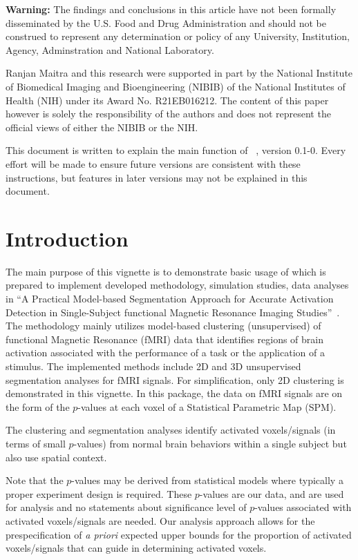 
{\color{red} \bf Warning:}
The findings and conclusions in this article have not been
formally disseminated by the U.S. Food and Drug Administration
and should not be construed to represent any determination or
policy of any University, Institution, Agency, Adminstration
and National Laboratory.

Ranjan Maitra and
this research were supported in part by the National Institute of
Biomedical Imaging and Bioengineering (NIBIB) of the National
Institutes of Health (NIH) under its Award No. R21EB016212.
The content of this paper however is solely the responsibility of the 
authors and does not represent the official views of either the
NIBIB or the NIH.

This document is written to explain the main
function of ~\citep{Chen2018}, version 0.1-0.
Every effort will be made to ensure future versions are consistent with
these instructions, but features in later versions may not be explained
in this document.



\section[Introduction]{Introduction}
\label{sec:introduction}

The main purpose of this vignette is to demonstrate basic usage of
 which is prepared to implement  developed methodology,
simulation studies, data analyses in
``A Practical Model-based Segmentation Approach for Accurate
Activation Detection in Single-Subject functional Magnetic
Resonance Imaging Studies''~\citep{ChenMaitra2021}.
The methodology mainly utilizes model-based clustering (unsupervised)
of functional Magnetic Resonance (fMRI) data that identifies regions
of brain activation associated with the performance of a task or the
application of a stimulus. The implemented methods include
2D and 3D unsupervised segmentation analyses for fMRI signals. 
For simplification, only 2D clustering is demonstrated in this vignette.
In this package, the data on fMRI signals are on the form of the
$p$-values at each voxel of a Statistical Parametric Map (SPM).

The clustering and segmentation analyses identify activated
voxels/signals (in terms of small $p$-values) from normal brain
behaviors within a single subject but also use spatial context. 

Note that the $p$-values may be derived from statistical models where
typically a proper experiment design is required.
These $p$-values are our data, and are used for 
analysis and no statements about significance level of $p$-values
associated with activated voxels/signals are needed.
Our analysis
approach allows for the prespecification of {\em a priori} expected
upper bounds for the proportion of activated voxels/signals that can
guide in determining activated voxels. 

